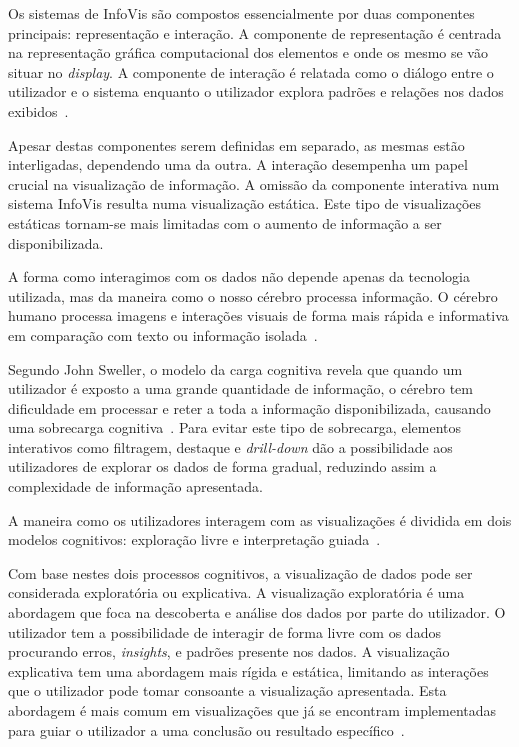 Os sistemas de \gls{InfoVis} são compostos essencialmente por duas componentes principais: representação e interação. A componente de representação é centrada na representação gráfica computacional dos elementos e onde os mesmo se vão situar no \textit{display}. A componente de interação é relatada como o diálogo entre o utilizador e o sistema enquanto o utilizador explora padrões e relações nos dados exibidos~\cite{yi2007toward}. 

Apesar destas componentes serem definidas em separado, as mesmas estão interligadas, dependendo uma da outra. A interação desempenha um papel crucial na visualização de informação. A omissão da componente interativa num sistema \gls{InfoVis} resulta numa visualização estática. Este tipo de visualizações estáticas tornam-se mais limitadas com o aumento de informação a ser disponibilizada.

A forma como interagimos com os dados não depende apenas da tecnologia utilizada, mas da maneira como o nosso cérebro processa informação. O cérebro humano processa imagens e interações visuais de forma mais rápida e informativa em comparação com texto ou informação isolada~\cite{ware2019information}.

Segundo John Sweller, o modelo da carga cognitiva revela que quando um utilizador é exposto a uma grande quantidade de informação, o cérebro tem dificuldade em processar e reter a toda a informação disponibilizada, causando uma sobrecarga cognitiva~\cite{sweller1988cognitive}. Para evitar este tipo de sobrecarga, elementos interativos como filtragem, destaque e \textit{drill-down} dão a possibilidade aos utilizadores de explorar os dados de forma gradual, reduzindo assim a complexidade de informação apresentada.

A maneira como os utilizadores interagem com as visualizações é dividida em dois modelos cognitivos: exploração livre e interpretação guiada~\cite{munzner2014visualization}.

Com base nestes dois processos cognitivos, a visualização de dados pode ser considerada exploratória ou explicativa. A visualização exploratória é uma abordagem que foca na descoberta e análise dos dados por parte do utilizador. O utilizador tem a possibilidade de interagir de forma livre com os dados procurando erros, \textit{insights}, e padrões presente nos dados. A visualização explicativa tem uma abordagem mais rígida e estática, limitando as interações que o utilizador pode tomar consoante a visualização apresentada. Esta abordagem é mais comum em visualizações que já se encontram implementadas para guiar o utilizador a uma conclusão ou resultado específico~\cite{heer2012interactive}. 


